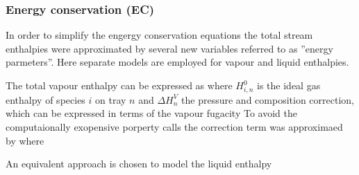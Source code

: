 \subsubsection{Energy conservation (EC)}
In order to simplify the engergy conservation equations the total stream enthalpies
were approximated by several new variables referred to as ''energy parmeters''.
Here separate models are employed for vapour and liquid enthalpies. 

The total vapour enthalpy can be expressed as 
where $H^0_{i, n}$ is the ideal gas enthalpy of species $i$ on tray $n$ and $\Delta H^V_n$
the pressure and composition correction, which can be expressed in terms of the vapour fugacity 
To avoid the computaionally exopensive porperty calls the correction term was approximaed by
where 

An equivalent approach is chosen to model the liquid enthalpy



